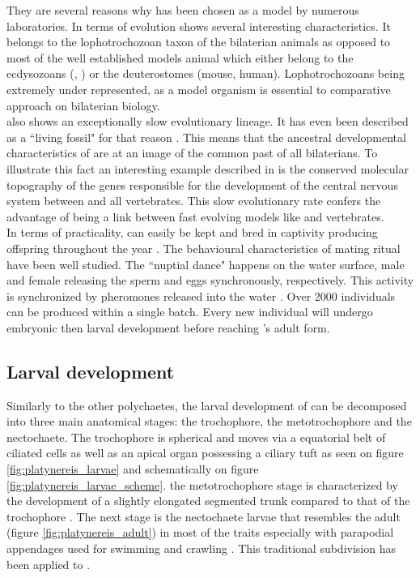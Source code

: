      They are several reasons why \platy{} has been chosen as a model by numerous laboratories. In terms of evolution \platy{} shows several interesting characteristics. It belongs to the lophotrochozoan taxon of the bilaterian animals as opposed to most of the well established models animal which either belong to the ecdysozoans (, ) or the deuterostomes (mouse, human). Lophotrochozoans being extremely under represented, \platy{} as a model organism is essential to comparative approach on bilaterian biology.\\
     
     \platy{} also shows an exceptionally slow evolutionary lineage. It has even been described as a ``living fossil" for that reason \cite{Fischer10}. This means that the ancestral developmental characteristics of \platy{} are at an image of the common past of all bilaterians. To illustrate this fact an interesting example described in \cite{denes07,tessmar07} is the conserved molecular topography of the genes responsible for the development of the central nervous system between \platy{} and all vertebrates. This slow evolutionary rate confers \platy{} the advantage of being a link between fast evolving models like  and vertebrates.\\
     
     In terms of practicality, \platy{} can easily be kept and bred in captivity producing offspring throughout the year \cite{fischer04}. The behavioural characteristics of \platy{} mating ritual have been well studied. The ``nuptial dance" happens on the water surface, male and female releasing the sperm and eggs synchronously, respectively. This activity is synchronized by pheromones released into the water \cite{zeeck98}. Over 2000 individuals can be produced within a single batch. Every new individual will undergo embryonic then larval development before reaching \platy{}'s adult form.\\

 
     \subsection{Larval development}
    Similarly to the other polychaetes, the larval development of \platy{} can be decomposed into three main anatomical stages: the trochophore, the metotrochophore and the nectochaete. The trochophore is spherical and moves via a equatorial belt of ciliated cells as well as an apical organ possessing a ciliary tuft \cite{rouse99,nielsen04} as seen on figure \ref{fig:platynereis_larvae} and schematically on figure \ref{fig:platynereis_larvae_scheme}. the metotrochophore stage is characterized by the development of a slightly elongated segmented trunk compared to that of the trochophore \cite{hacker98}. The next stage is the nectochaete larvae that resembles the adult (figure \ref{fig:platynereis_adult}) in most of the traits especially with parapodial appendages used for swimming and crawling \cite{hacker98}. This traditional subdivision has been applied to \platy{} \cite{hauenschild69}.\\
    
